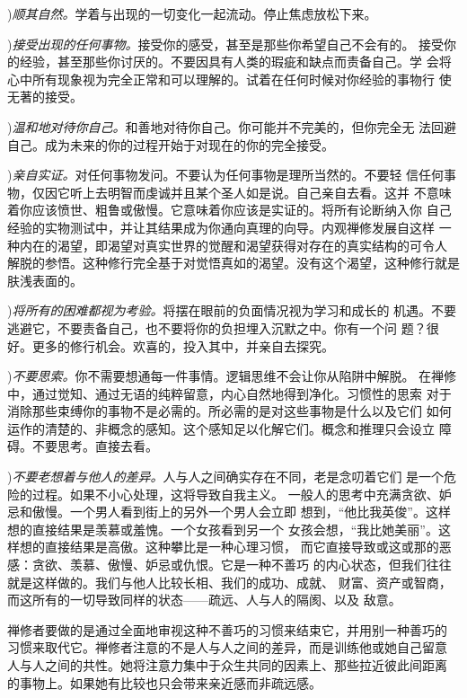 ){\it 顺其自然。}学着与出现的一切变化一起流动。停止焦虑放松下来。


){\it 接受出现的任何事物。}接受你的感受，甚至是那些\1你希望自己不会有的。
接受你的经验，甚至那些你讨厌的。不要因具有人类的瑕疵和缺点而责备自己。学
会将心中所有现象视为完全正常和可以理解的。试着在任何时候对你经验的事物行
使无著的接受。

){\it 温和地对待你自己。}和善地对待你自己。你可能并不完美的，但你完全无
法回避自己。成为未来的你的过程开始于对现在的你的完全接受。

){\it 亲自实证。}对任何事物发问。不要认为任何事物是理所当然的。不要轻
信任何事物，仅因它听上去明智而虔诚并且某个圣人如是说。自己亲自去看。这并
不意味着你应该愤世、粗鲁或傲慢。它意味着你应该是实证的。将所有论断纳入你
自己经验的实物测试中，并让其结果成为你通向真理的向导。内观禅修发展自这样
一种内在的渴望，即渴望对真实世界的觉醒和渴望获得对存在的真实结构的可令人
解脱的参悟。这种修行完全基于对觉悟真如的渴望。没有这个渴望，这种修行就是
肤浅表面的。

){\it 将所有的困难都视为考验。}将摆在眼前的负面情况视为学习和成长的
机遇。不要逃避它，不要责备自己，也不要将你的负担埋入沉默之中。你有一个问
题？很好。更多的修行机会。欢喜的，投入其中，并亲自去探究。

){\it 不要思索。}你不需要想通每一件事情。逻辑思维不会让你从陷阱中解脱。
在禅修中，通过觉知、通过无语的纯粹留意，内心自然地得到净化。习惯性的思索
对于消除\1那些束缚你的事物不是必需的。所必需的是对这些事物是什么以及它们
如何运作的清楚的、非概念的感知。这个感知足以化解它们。概念和推理只会设立
障碍。不要思考。直接去看。

){\it 不要老想着与他人的差异。}人与人之间确实存在不同，老是念叨着它们
是一个危险的过程。如果不小心处理，这将导致自我主义。
一般人的思考中充满贪欲、妒忌和傲慢。一个男人看到街上的另外一个男人会立即
想到，“他比我英俊”。这样想的直接结果是羡慕或羞愧。一个女孩看到另一个
女孩会想，“我比她美丽”。这样想的直接结果是高傲。这种攀比是一种心理习惯，
而它直接导致或这或那的恶感：贪欲、羡慕、傲慢、妒忌或仇恨。它是一种不善巧
的内心状态，但我们往往就是这样做的。我们与他人比较长相、我们的成功、成就、
财富、资产或智商，而这所有的一切导致同样的状态——疏远、人与人的隔阂、以及
敌意。

禅修者要做的是通过全面地审视这种不善巧的习惯来结束它，并用别一种善巧的
习惯来取代它。禅修者注意的不是人与人之间的差异，而是训练他或她自己留意
人与人之间的共性。她将注意力集中于众生共同的因素上、那些拉近彼此间距离
的事物上。如果她有比较也只会带来亲近感而非疏远感。

